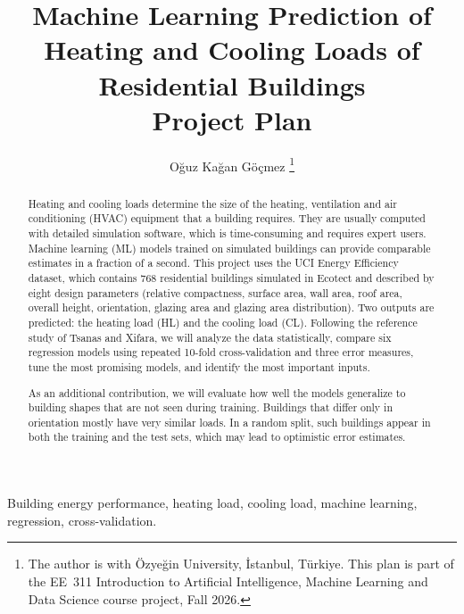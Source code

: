 \documentclass[journal]{IEEEtran}
\newcommand{\authorname}{Oğuz Kağan Göçmez}
\begin{document}
\title{Machine Learning Prediction of Heating and Cooling Loads of Residential Buildings\\[0.3em]
{\LARGE Project Plan}}

\author{\authorname%
\thanks{The author is with Özyeğin University, İstanbul, Türkiye.
This plan is part of the EE~311 Introduction to Artificial Intelligence,
Machine Learning and Data Science course project, Fall 2026.}}

\maketitle

\begin{abstract}
Heating and cooling loads determine the size of the heating, ventilation and air conditioning (HVAC)
equipment that a building requires. They are usually computed with detailed simulation software, which is
time-consuming and requires expert users. Machine learning (ML) models trained on simulated buildings can
provide comparable estimates in a fraction of a second. This project uses the UCI Energy Efficiency dataset,
which contains 768 residential buildings simulated in Ecotect and described by eight design parameters
(relative compactness, surface area, wall area, roof area, overall height, orientation, glazing area and
glazing area distribution). Two outputs are predicted: the heating load (HL) and the cooling load (CL).
Following the reference study of Tsanas and Xifara, we will analyze the data statistically, compare six
regression models using repeated 10-fold cross-validation and three error measures, tune the most
promising models, and identify the most important inputs.

As an additional contribution, we will evaluate how well the models generalize to building shapes that
are not seen during training. Buildings that differ only in orientation mostly have very similar loads.
In a random split, such buildings appear in both the training and the test sets, which may lead to
optimistic error estimates.
\end{abstract}

\begin{IEEEkeywords}
Building energy performance, heating load, cooling load, machine learning, regression, cross-validation.
\end{IEEEkeywords}

\end{document}
